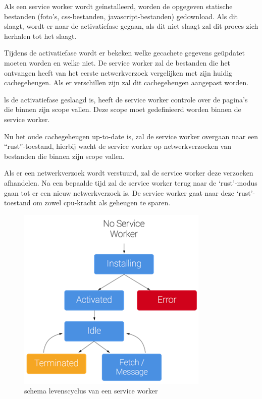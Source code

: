 		Als een service worker wordt geïnstalleerd, worden de opgegeven statische bestanden (foto’s, css-bestanden, javascript-bestanden) gedownload. Als dit slaagt, wordt er naar de activatiefase gegaan, als dit niet slaagt zal dit proces zich herhalen tot het slaagt. 
		
		Tijdens de activatiefase wordt er bekeken welke gecachete gegevens geüpdatet moeten worden en welke niet. De service worker zal de bestanden die het ontvangen heeft van het eerste netwerkverzoek vergelijken met zijn huidig cachegeheugen. Als er verschillen zijn zal dit cachegeheugen aangepast worden.
		
		ls de activatiefase geslaagd is, heeft de service worker controle over de pagina’s die binnen zijn scope vallen. Deze scope moet gedefinieerd worden binnen de service worker.
		
		Nu het oude cachegeheugen up-to-date is, zal de service worker overgaan naar een “rust”-toestand, hierbij wacht de service worker op netwerkverzoeken van bestanden die binnen zijn scope vallen.
		
		Als er een netwerkverzoek wordt verstuurd, zal de service worker deze verzoeken afhandelen. Na een bepaalde tijd zal de service worker terug naar de ‘rust’-modus gaan tot er een nieuw netwerkverzoek is. De service worker gaat naar deze ‘rust’-toestand om zowel cpu-kracht als geheugen te sparen.
		
		
		\autocite{Gaunt2019}
		
		
		\begin{figure}[!htb]
			\centering
			\includegraphics{./img/ServiceWorkerLifeCycle.png}
			\caption{schema levenscyclus van een service worker \autocite{Gaunt2019}}
		\end{figure}
	

